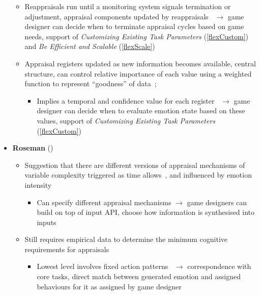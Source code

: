 \begin{itemize}
\begin{itemize}
        \item Reappraisals run until a monitoring system signals termination or
        adjustment, appraisal components updated by
        reappraisals~\citep[p.~99]{scherer2001appraisalB} $\rightarrow$ game
        designer can decide when to terminate appraisal cycles based on game
        needs, support of \textit{Customizing Existing Task Parameters}
        (\ref{flexCustom}) and \textit{Be Efficient and Scalable}
        (\ref{flexScale})

        \item Appraisal registers updated as new information becomes available,
        central structure, can control relative importance of each
        value using a weighted function to represent ``goodness'' of
        data~\citep[p.~105]{scherer2001appraisalB};
        \begin{itemize}
            \item Implies a temporal and confidence value for each
            register~\citep[p.~106]{scherer2001appraisalB} $\rightarrow$ game
            designer can decide when to evaluate emotion state based on these
            values, support of \textit{Customizing Existing Task Parameters}
            (\ref{flexCustom})
        \end{itemize}
    \end{itemize}

    \item \textbf{Roseman} (\good)
    \begin{itemize}
        \item Suggestion that there are different versions of appraisal
        mechanisms of variable complexity triggered as time
        allows~\citep[p.~77]{roseman2001model}, and influenced by emotion
        intensity~\citep[p.~440]{roseman2011emotional}
        \begin{itemize}
            \item Can specify different appraisal mechanisms $\rightarrow$ game
            designers can build on top of input API, choose how information is
            synthesised into \progname{} inputs
        \end{itemize}

        \item Still requires empirical data to determine the minimum cognitive
        requirements for appraisals~\citep[p.~87--88]{roseman2001model}
        \begin{itemize}
            \item Lowest level involves fixed action
            patterns~\citep[p.~32]{clore2000cognition} $\rightarrow$
            correspondence with core \progname{} tasks, direct match between
            generated emotion and assigned behaviours for it as assigned by
            game designer


\end{itemize}
\end{itemize}
\end{itemize}
